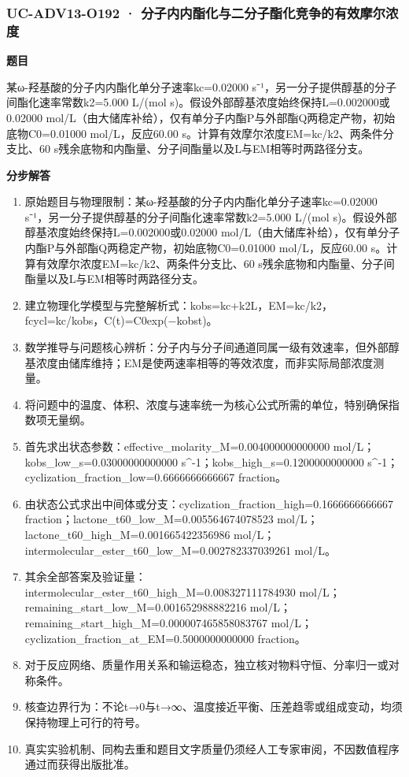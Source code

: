 \documentclass[UTF8,11pt,a4paper]{ctexart}
\begin{document}
\subsubsection*{UC-ADV13-O192 · 分子内内酯化与二分子酯化竞争的有效摩尔浓度}
\noindent\textbf{题目}\par
某ω-羟基酸的分子内内酯化单分子速率kc=0.02000 s⁻¹，另一分子提供醇基的分子间酯化速率常数k2=5.000 L/(mol s)。假设外部醇基浓度始终保持L=0.002000或0.02000 mol/L（由大储库补给），仅有单分子内酯P与外部酯Q两稳定产物，初始底物C0=0.01000 mol/L，反应60.00 s。计算有效摩尔浓度EM=kc/k2、两条件分支比、60 s残余底物和内酯量、分子间酯量以及L与EM相等时两路径分支。\par
\medskip\noindent\textbf{分步解答}
\begin{enumerate}
\item 原始题目与物理限制：某ω-羟基酸的分子内内酯化单分子速率kc=0.02000 s⁻¹，另一分子提供醇基的分子间酯化速率常数k2=5.000 L/(mol s)。假设外部醇基浓度始终保持L=0.002000或0.02000 mol/L（由大储库补给），仅有单分子内酯P与外部酯Q两稳定产物，初始底物C0=0.01000 mol/L，反应60.00 s。计算有效摩尔浓度EM=kc/k2、两条件分支比、60 s残余底物和内酯量、分子间酯量以及L与EM相等时两路径分支。
\item 建立物理化学模型与完整解析式：kobs=kc+k2L，EM=kc/k2，fcycl=kc/kobs，C(t)=C0exp(−kobst)。
\item 数学推导与问题核心辨析：分子内与分子间通道同属一级有效速率，但外部醇基浓度由储库维持；EM是使两速率相等的等效浓度，而非实际局部浓度测量。
\item 将问题中的温度、体积、浓度与速率统一为核心公式所需的单位，特别确保指数项无量纲。
\item 首先求出状态参数：effective\_molarity\_M=0.004000000000000 mol/L；kobs\_low\_s=0.03000000000000 s\textasciicircum{}-1；kobs\_high\_s=0.1200000000000 s\textasciicircum{}-1；cyclization\_fraction\_low=0.6666666666667 fraction。
\item 由状态公式求出中间体或分支：cyclization\_fraction\_high=0.1666666666667 fraction；lactone\_t60\_low\_M=0.005564674078523 mol/L；lactone\_t60\_high\_M=0.001665422356986 mol/L；intermolecular\_ester\_t60\_low\_M=0.002782337039261 mol/L。
\item 其余全部答案及验证量：intermolecular\_ester\_t60\_high\_M=0.008327111784930 mol/L；remaining\_start\_low\_M=0.001652988882216 mol/L；remaining\_start\_high\_M=0.000007465858083767 mol/L；cyclization\_fraction\_at\_EM=0.5000000000000 fraction。
\item 对于反应网络、质量作用关系和输运稳态，独立核对物料守恒、分率归一或对称条件。
\item 核查边界行为：不论t→0与t→∞、温度接近平衡、压差趋零或组成变动，均须保持物理上可行的符号。
\item 真实实验机制、同构去重和题目文字质量仍须经人工专家审阅，不因数值程序通过而获得出版批准。
\end{enumerate}
\end{document}
